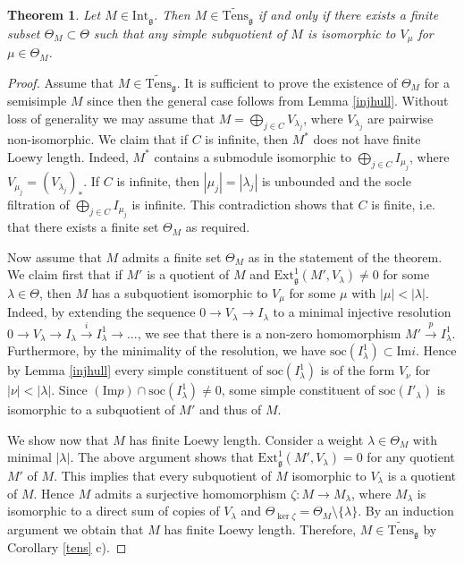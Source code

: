 \documentclass{birkmult}
\newcounter{theorem}
\newtheorem{theo}{Theorem}[section]
\renewcommand{\gg}{\mathfrak{g}}
\newcommand{\refle}[1]{Lemma \ref{#1}}
\newcommand{\im}{\mathrm{Im}}
\newcommand{\ext}{\mathrm{Ext}}
\newcommand{\Int}{\mathrm{Int}}
\newcommand{\lind}{\widetilde{\mathrm{Tens}}}
\newcommand{\soc}{\mathrm{soc}}
\begin{document}
\begin{theo}\label{subquotients} Let $M\in\Int_{\gg}$. Then $M\in\lind_\gg$
if and only if there
  exists a finite subset $\Theta_M\subset\Theta$ such that any simple subquotient
of $M$ is isomorphic to $V_\mu$ for $\mu\in \Theta_M$.
\end{theo}

\begin{proof}
Assume that $M\in\lind_\gg$. It is sufficient to prove the 
existence of $\Theta_M$ for a semisimple
  $M$ since then the general case follows from Lemma \ref{injhull}.
Without loss of generality we may assume that $M= \bigoplus_{j\in
C} V_{\lambda_j}$, where $V_{\lambda_j}$ are pairwise
non-isomorphic. We claim that if $C$ is infinite, then $M^*$ does
not have finite Loewy length. Indeed, $M^*$ contains a submodule
isomorphic to $\bigoplus_{j\in C} I_{\mu_j}$, where
$V_{\mu_j}=(V_{\lambda_j})_*$. If $C$ is infinite, then
$|\mu_j|=|\lambda_j|$ is unbounded and the socle filtration of
$\bigoplus_{j\in C} I_{\mu_j}$ is infinite. This contradiction shows that $C$
is finite, i.e. that there exists a finite set $\Theta_M$ as required.

Now assume that $M$ admits a finite set $\Theta_M$ as in the statement
of the theorem. We claim first that if $M'$ is a quotient of $M$ and
$\ext_\gg^1(M',V_\lambda)\neq 0$ for some $\lambda\in\Theta$, then $M$
has a subquotient isomorphic to $V_\mu$ for some $\mu$ with $|\mu|<|\lambda|$. Indeed,
by extending the sequence $0\rightarrow V_\lambda\rightarrow
I_\lambda$ to a minimal injective resolution $0\rightarrow V_\lambda
\rightarrow I_\lambda\stackrel{i}{\rightarrow}I_\lambda^1\rightarrow ...$,
we see that there is a non-zero homomorphism $M'\stackrel{p}{\rightarrow} I_\lambda^1$.
Furthermore, by the minimality of the resolution, we have $\soc(I_\lambda^1)\subset\im i$.
Hence by \refle{injhull} every simple constituent of $\soc(I_\lambda^1)$ is
of the form $V_\nu$ for $|\nu| <|\lambda|$. Since $(\im p)\cap\soc(I_\lambda^1)\neq 0$,
some simple constituent of $\soc(I'_\lambda)$ is isomorphic to a subquotient of $M'$
and thus of $M$.

We show now that $M$ has finite Loewy length. Consider a weight $\lambda\in\Theta_M$ with minimal $|\lambda|$. The above argument shows that
$\ext_\gg^1(M',V_\lambda)=0$ for any quotient $M'$ of $M$. This implies that
every subquotient of $M$ isomorphic to $V_\lambda$ is a quotient of $M$.
Hence $M$ admits a surjective homomorphism $\zeta :M\rightarrow M_\lambda$,
where $M_\lambda$ is isomorphic to a direct sum of copies of $V_\lambda$
and $\Theta_{\ker\zeta}=\Theta_M\setminus\{\lambda\}$. By an induction argument
we obtain that $M$ has finite Loewy length. Therefore, $M\in\lind_\gg$
by Corollary \ref{tens} c).
\end{proof}
\end{document}
